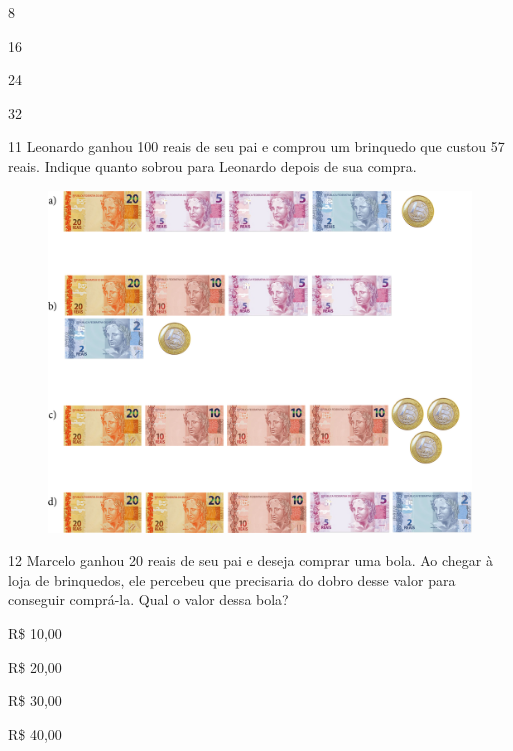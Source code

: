 \begin{escolha}[itemsep=-5pt]
\item 8

\item 16

\item 24

\item 32
\end{escolha}

\num{11} Leonardo ganhou 100 reais de seu pai e comprou um brinquedo que custou
57 reais. Indique quanto sobrou para Leonardo depois de sua compra.

\begin{figure}[H]
\includegraphics[width=\textwidth]{./media/image131.png}
\end{figure}

\num{12} Marcelo ganhou 20 reais de seu pai e deseja comprar uma bola. Ao chegar
à loja de brinquedos, ele percebeu que precisaria do dobro desse valor
para conseguir comprá-la. Qual o valor dessa bola?

\begin{escolha}[itemsep=-5pt]
\item R\$ 10,00

\item R\$ 20,00

\item R\$ 30,00

\item R\$ 40,00
\end{escolha}


